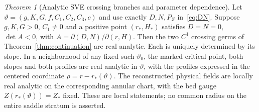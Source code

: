 \documentclass[12pt,a4paper,oneside]{report}
\numberwithin{equation}{chapter}
\theoremstyle{remark}\newtheorem{remark}[theorem]{Remark}
\newtheorem{supptheorem}[suppprop]{Theorem}
\begin{document}
\begin{supptheorem}[Analytic SVE crossing branches and parameter dependence]
\label{thm:analytic-critical}
Let $\vartheta=(g,K,G,f,C_1,C_2,C_3,c)$ and use exactly $D,N,P_Z$
in~\eqref{eq:DN}. Suppose $g,K,G>0$, $C_1\ne0$ and a positive point
$(r_*,H_*)$ satisfies $D=N=0$, $\det A<0$, with
$A=\partial(D,N)/\partial(r,H)$. Then the two $C^1$ crossing germs of
Theorem~\ref{thm:continuation} are real analytic. Each is uniquely determined
by its slope. In a neighborhood of any fixed such $\vartheta_0$, the marked
critical point, both slopes and both profiles are real analytic in
$\vartheta$, with the profiles expressed in the centered coordinate
$\rho=r-r_*(\vartheta)$. The reconstructed physical fields are locally real
analytic on the corresponding annular chart, with the bed gauge
$Z(r_*(\vartheta))=Z_*$ fixed. These are local statements;
no common radius on the entire saddle stratum is asserted.
\end{supptheorem}
\end{document}
